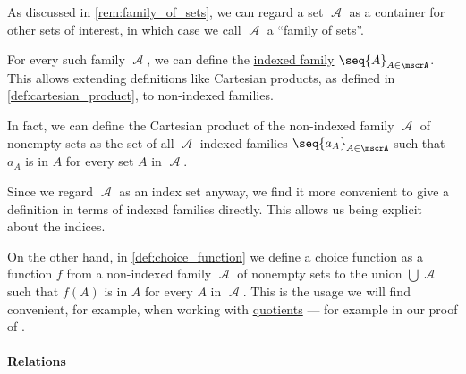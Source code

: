 \begin{remark}\label{rem:family_to_indexed_family}
  As discussed in \cref{rem:family_of_sets}, we can regard a set \( \mscrA \) as a container for other sets of interest, in which case we call \( \mscrA \) a \enquote{family of sets}.

  For every such family \( \mscrA \), we can define the \hyperref[def:indexed_family]{indexed family} \( \seq{ A }_{A \in \mscrA} \). This allows extending definitions like Cartesian products, as defined in \cref{def:cartesian_product}, to non-indexed families.

  In fact, we can define the Cartesian product of the non-indexed family \( \mscrA \) of nonempty sets as the set of all \( \mscrA \)-indexed families \( \seq{ a_A }_{A \in \mscrA} \) such that \( a_A \) is in \( A \) for every set \( A \) in \( \mscrA \).

  Since we regard \( \mscrA \) as an index set anyway, we find it more convenient to give a definition in terms of indexed families directly. This allows us being explicit about the indices.

  On the other hand, in \cref{def:choice_function} we define a choice function as a function \( f \) from a non-indexed family \( \mscrA \) of nonempty sets to the union \( \bigcup \mscrA \) such that \( f(A) \) is in \( A \) for every \( A \) in \( \mscrA \). This is the usage we will find convenient, for example, when working with \hyperref[def:equivalence_relation/quotient]{quotients} --- for example in our proof of .
\end{remark}

\paragraph{Relations}

